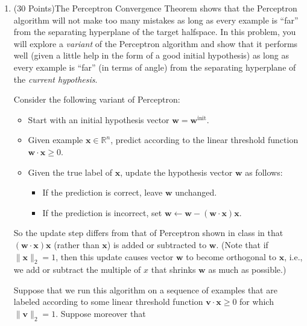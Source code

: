 \documentclass[a4paper]{article}
\theoremstyle{definition}
\renewcommand\vec[1]{\boldsymbol{#1}}
\begin{document}
\begin{enumerate}
\item (30 Points)The Perceptron Convergence Theorem shows that
the Perceptron algorithm will not make too many mistakes
as long as every example is ``far'' from the separating hyperplane of the target halfspace.
In this problem, you will explore a {\em variant} of the Perceptron algorithm
and show that it performs well (given a little help in the form of a good initial hypothesis)
as long as every example is ``far'' (in terms of angle)
from the separating hyperplane of the \textit{current hypothesis}.

Consider the following variant of Perceptron:

\begin{itemize}

\item Start with an initial hypothesis vector $\vec w = \vec w^{\text{init}}$.

\item Given example $\vec x \in \mathbb{R}^n$,
predict according to the linear threshold function $\vec w \cdot \vec x \geq 0$.

\item Given the true label of $\vec x$, update the hypothesis vector $\vec w$ as follows:

\begin{itemize}

\item If the prediction is correct, leave $\vec w$ unchanged.

\item If the prediction is incorrect, set $\vec w \leftarrow \vec w - (\vec w \cdot \vec x) \vec x$.

\end{itemize}

\end{itemize}

So the update step differs from that of Perceptron shown in class 
in that $(\vec w \cdot \vec x) \vec x$ (rather than $\vec x$) is added or subtracted to $\vec w$.
(Note that if $\|\vec x\|_2 = 1$, then this update causes vector $\vec w$ to become orthogonal to $\vec x$,
i.e., we add or subtract the multiple of $x$ that shrinks $\vec w$ as much as possible.)

Suppose that we run this algorithm on a sequence of examples that are labeled
according to some linear threshold function $\vec v \cdot \vec x \geq 0$
for which $\|\vec v\|_2 = 1$. Suppose moreover that

\begin{itemize}


\end{itemize}
\end{enumerate}
\end{document}
